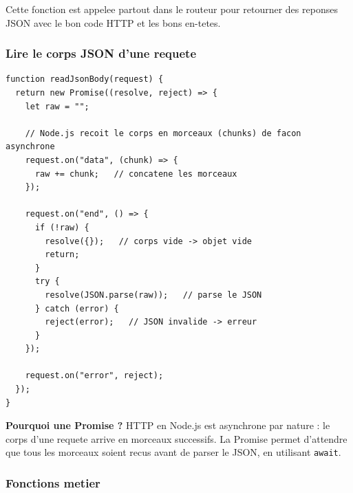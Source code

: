 \documentclass[12pt,a4paper]{article}
\begin{document}
Cette fonction est appelee partout dans le routeur pour retourner des reponses JSON avec le bon code HTTP et les bons en-tetes.

\subsubsection{Lire le corps JSON d'une requete}

\begin{lstlisting}[style=js, caption={server.js --- Fonction readJsonBody()}]
function readJsonBody(request) {
  return new Promise((resolve, reject) => {
    let raw = "";

    // Node.js recoit le corps en morceaux (chunks) de facon asynchrone
    request.on("data", (chunk) => {
      raw += chunk;   // concatene les morceaux
    });

    request.on("end", () => {
      if (!raw) {
        resolve({});   // corps vide -> objet vide
        return;
      }
      try {
        resolve(JSON.parse(raw));   // parse le JSON
      } catch (error) {
        reject(error);   // JSON invalide -> erreur
      }
    });

    request.on("error", reject);
  });
}
\end{lstlisting}

\begin{infobox}
\textbf{Pourquoi une Promise ?} HTTP en Node.js est asynchrone par nature : le corps d'une requete arrive en morceaux successifs. La Promise permet d'attendre que tous les morceaux soient recus avant de parser le JSON, en utilisant \texttt{await}.
\end{infobox}

\subsubsection{Fonctions metier}
\end{document}
